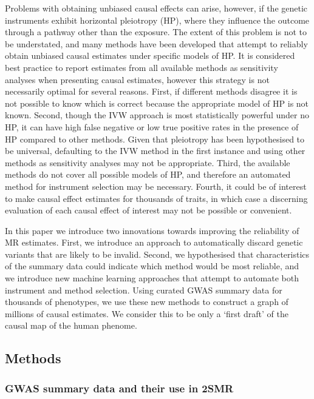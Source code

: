 \documentclass[]{article}
\begin{document}
Problems with obtaining unbiased causal effects can arise, however, if
the genetic instruments exhibit horizontal pleiotropy (HP), where they
influence the outcome through a pathway other than the exposure. The
extent of this problem is not to be understated, and many methods have
been developed that attempt to reliably obtain unbiased causal estimates
under specific models of HP. It is considered best practice to report
estimates from all available methods as sensitivity analyses when
presenting causal estimates, however this strategy is not necessarily
optimal for several reasons. First, if different methods disagree it is
not possible to know which is correct because the appropriate model of
HP is not known. Second, though the IVW approach is most statistically
powerful under no HP, it can have high false negative or low true
positive rates in the presence of HP compared to other methods. Given
that pleiotropy has been hypothesised to be universal, defaulting to the
IVW method in the first instance and using other methods as sensitivity
analyses may not be appropriate. Third, the available methods do not
cover all possible models of HP, and therefore an automated method for
instrument selection may be necessary. Fourth, it could be of interest
to make causal effect estimates for thousands of traits, in which case a
discerning evaluation of each causal effect of interest may not be
possible or convenient.

In this paper we introduce two innovations towards improving the
reliability of MR estimates. First, we introduce an approach to
automatically discard genetic variants that are likely to be invalid.
Second, we hypothesised that characteristics of the summary data could
indicate which method would be most reliable, and we introduce new
machine learning approaches that attempt to automate both instrument and
method selection. Using curated GWAS summary data for thousands of
phenotypes, we use these new methods to construct a graph of millions of
causal estimates. We consider this to be only a `first draft' of the
causal map of the human phenome.

\subsection{Methods}\label{methods}

\subsubsection{GWAS summary data and their use in
2SMR}\label{gwas-summary-data-and-their-use-in-2smr}
\end{document}
